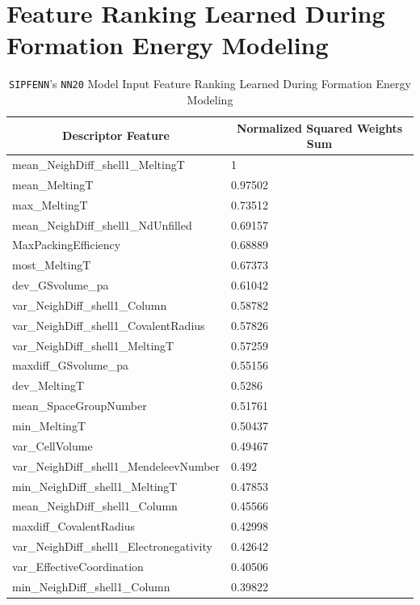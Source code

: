 \section{Feature Ranking Learned During Formation Energy Modeling} 
\label{sipfenn:appendix3}

\begin{longtable}{|l|l|}
\caption{\texttt{SIPFENN}'s \texttt{NN20} Model Input Feature Ranking Learned During Formation Energy Modeling}
\label{sipfenn:appendix3:featureranking}\\
\hline
\multicolumn{1}{|c|}{\textbf{Descriptor Feature}} & \multicolumn{1}{c|}{\textbf{Normalized Squared Weights Sum}} \\ \hline
\endfirsthead
%
\endhead
%
mean\_NeighDiff\_shell1\_MeltingT & 1 \\ \hline
mean\_MeltingT & 0.97502 \\ \hline
max\_MeltingT & 0.73512 \\ \hline
mean\_NeighDiff\_shell1\_NdUnfilled & 0.69157 \\ \hline
MaxPackingEfficiency & 0.68889 \\ \hline
most\_MeltingT & 0.67373 \\ \hline
dev\_GSvolume\_pa & 0.61042 \\ \hline
var\_NeighDiff\_shell1\_Column & 0.58782 \\ \hline
var\_NeighDiff\_shell1\_CovalentRadius & 0.57826 \\ \hline
var\_NeighDiff\_shell1\_MeltingT & 0.57259 \\ \hline
maxdiff\_GSvolume\_pa & 0.55156 \\ \hline
dev\_MeltingT & 0.5286 \\ \hline
mean\_SpaceGroupNumber & 0.51761 \\ \hline
min\_MeltingT & 0.50437 \\ \hline
var\_CellVolume & 0.49467 \\ \hline
var\_NeighDiff\_shell1\_MendeleevNumber & 0.492 \\ \hline
min\_NeighDiff\_shell1\_MeltingT & 0.47853 \\ \hline
mean\_NeighDiff\_shell1\_Column & 0.45566 \\ \hline
maxdiff\_CovalentRadius & 0.42998 \\ \hline
var\_NeighDiff\_shell1\_Electronegativity & 0.42642 \\ \hline
var\_EffectiveCoordination & 0.40506 \\ \hline
min\_NeighDiff\_shell1\_Column & 0.39822 \\ \hline

\end{longtable}
